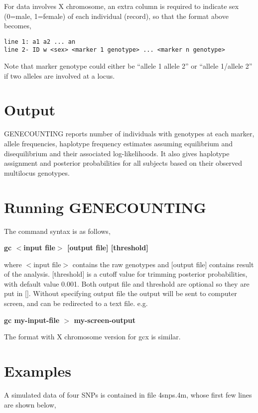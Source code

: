 \documentclass[11pt]{article}
\begin{document}
\medskip\noindent For data involves X chromosome, an extra column
is required to indicate sex (0=male, 1=female) of each individual
(record), so that the format above becomes,

\begin{verbatim}
line 1: a1 a2 ... an
line 2- ID w <sex> <marker 1 genotype> ... <marker n genotype>
\end{verbatim}

\medskip\noindent Note that marker genotype could either be ``allele 1
allele 2'' or ``allele 1/allele 2'' if two alleles are involved at a
locus.


\section{Output}

\medskip\noindent GENECOUNTING reports number of individuals with
genotypes at each marker, allele frequencies, haplotype frequency
estimates assuming equilibrium and disequilibrium and their
associated log-likelihoods. It also gives haplotype assignment and
posterior probabilities for all subjects based on their observed
multilocus genotypes.


\section{Running GENECOUNTING}

\medskip\noindent The command syntax is as follows,

\medskip
{\bf gc $<$input file$>$ [output file] [threshold]}

\medskip
\medskip\noindent where $<$input file$>$ contains the raw genotypes and
[output file] contains result of the analysis. [threshold] is a
cutoff value for trimming posterior probabilities, with default
value 0.001. Both output file and threshold are optional so they are
put in []. Without specifying output file the output will be sent to
computer screen, and can be redirected to a text file. e.g.

\medskip
{\bf gc my-input-file $>$ my-screen-output}
\medskip

\medskip\noindent The format with X chromosome version for gcx is similar.


\section{Examples}

\medskip\noindent A simulated data of four SNPs is contained in file
4snps.4m, whose first few lines are shown below,
\end{document}
